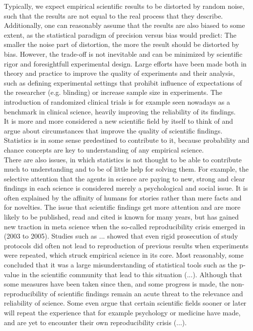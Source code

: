 \documentclass[11pt,a4paper,twoside]{book}\usepackage[]{graphicx}\usepackage[]{color}
\begin{document}
Typically, we expect empirical scientific results to be distorted by random noise, such that the results are not equal to the real process that they describe. Additionally, one can reasonably assume that the results are also biased to some extent, as the statistical paradigm of precision versus bias would predict: The smaller the noise part of distortion, the more the result should be distorted by bias. However, the trade-off is not inevitable and can be minimized by scientific rigor and foresightfull experimental design. Large efforts have been made both in theory and practice to improve the quality of experiments and their analysis, such as defining experimental settings that prohibit influence of expectations of the researcher (e.g. blinding) or increase sample size in experiments. The introduction of randomized clinical trials is for example seen nowadays as a benchmark in clinical science, heavily improving the reliability of its findings. \\
It is more and more considered a new scientific field by itself to think of and argue about circumstances that improve the quality of scientific findings. Statistics is in some sense predestined to contribute to it, because probability and chance concepts are key to understanding of any empirical science. \\
There are also issues, in which statistics is not thought to be able to contribute much to understanding and to be of little help for solving them. For example, the selective attention that the agents in science are paying to new, strong and clear findings in each science is considered merely a psychological and social%
issue. It is often explained by the affinity of humans for stories rather than mere facts and for novelties. The issue that scientific findings get more attention and are more likely to be published, read and cited is known for many years, but has gained new traction in meta science when the so-called reproducibility crisis emerged in (2003 to 2005). Studies such as ... showed that even rigid prosecution of study protocols did often not lead to reproduction of previous results when experiments were repeated, which struck empirical science in its core. Most reasonably, some concluded that it was a large misunderstanding of statistical tools such as the p-value in the scientific community that lead to this situation (...). Although that some measures have been taken since then, and some progress is made, the non-reproducibility of scientific findings remain an acute threat to the relevance and reliability of science. Some even argue that certain scientific fields sooner or later will repeat the experience that for example psychology or medicine have made, and are yet to encounter their own reproducibility crisis (...). \\
\end{document}
